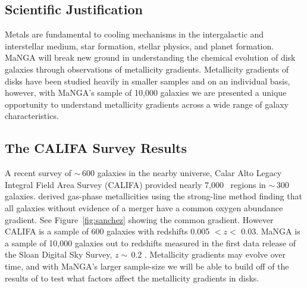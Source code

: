 \documentclass[11pt, a4paper, onecolumn]{article}
\begin{document}
\begin{multicols}{2}
\section{Scientific Justification}

    Metals are fundamental to cooling mechanisms in the intergalactic and
    interstellar medium, star formation, stellar physics, and planet
    formation.  MaNGA will break new ground in understanding the chemical
    evolution of disk galaxies through observations of metallicity gradients.
    Metallicity gradients of disks have been studied heavily in smaller samples
    \citet{sanchez14} and on an individual basis, however, with MaNGA's sample
    of 10,000 galaxies we are presented a unique opportunity to understand
    metallicity gradients across a wide range of galaxy characteristics.

\subsection{The CALIFA Survey Results}

    A recent survey of $\sim$\,600 galaxies in the nearby universe, Calar Alto
    Legacy Integral Field Area Survey (CALIFA) \citep{sanchez12} provided
    nearly 7,000 \hii\ regions in $\sim$\,300 galaxies. \citet{sanchez14}
    derived gas-phase metallicities using the strong-line method finding that
    all galaxies without evidence of a merger have a common oxygen abundance
    gradient. See Figure~\ref{fig:sanchez} showing the common gradient. However
    CALIFA is a sample of 600 galaxies with redshifts 0.005 $< z <$ 0.03. MaNGA
    is a sample of 10,000 galaxies out to redshifts measured in the first data
    release of the Sloan Digital Sky Survey, $z \sim\,0.2$
    \citep{abazajian03}.  Metallicity gradients may evolve over time, and with
    MaNGA's larger sample-size we will be able to build off of the results of
    \citet{sanchez14} to test what factors affect the metallicity gradients in
    disks.

    \begin{figure}[!ht]


\end{figure}
\end{multicols}
\end{document}
